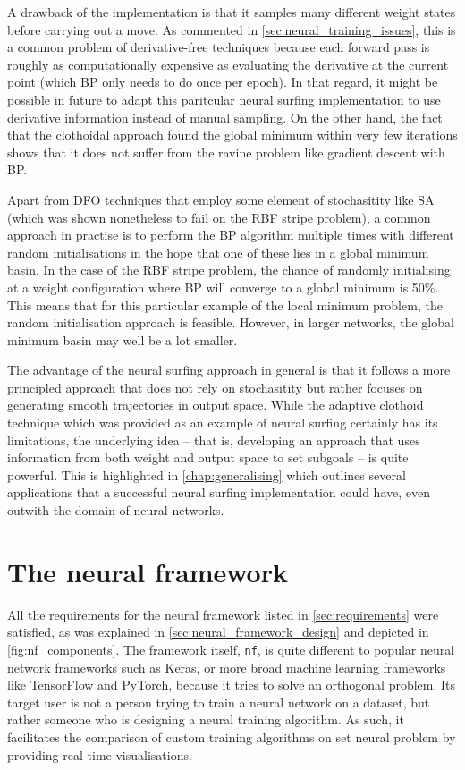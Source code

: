 A drawback of the implementation is that it samples many different weight states before carrying out a move.
As commented in \ref{sec:neural_training_issues}, this is a common problem of derivative-free techniques because each forward pass is roughly as computationally expensive as evaluating the derivative at the current point (which BP only needs to do once per epoch).
In that regard, it might be possible in future to adapt this paritcular neural surfing implementation to use derivative information instead of manual sampling.
On the other hand, the fact that the clothoidal approach found the global minimum within very few iterations shows that it does not suffer from the ravine problem like gradient descent with BP.

Apart from DFO techniques that employ some element of stochasitity like SA (which was shown nonetheless to fail on the RBF stripe problem),
a common approach in practise is to perform the BP algorithm multiple times with different random initialisations in the hope that one of these lies in a global minimum basin.
In the case of the RBF stripe problem, the chance of randomly initialising at a weight configuration where BP will converge to a global minimum is 50\%.
This means that for this particular example of the local minimum problem, the random initialisation approach is feasible.
However, in larger networks, the global minimum basin may well be a lot smaller.

The advantage of the neural surfing approach in general is that it follows a more principled approach that does not rely on stochasitity but rather focuses on generating smooth trajectories in output space.
While the adaptive clothoid technique which was provided as an example of neural surfing certainly has its limitations, the underlying idea -- that is, developing an approach that uses information from both weight and output space to set subgoals -- is quite powerful.
This is highlighted in \ref{chap:generalising} which outlines several applications that a successful neural surfing implementation could have, even outwith the domain of neural networks.

\section{The neural framework}
\label{sec:eval_neural_framework}
All the requirements for the neural framework listed in \ref{sec:requirements} were satisfied, as was explained in \ref{sec:neural_framework_design} and depicted in \ref{fig:nf_components}.
The framework itself, \texttt{nf}, is quite different to popular neural network frameworks such as Keras, or more broad machine learning frameworks like TensorFlow and PyTorch, because it tries to solve an orthogonal problem.
Its target user is not a person trying to train a neural network on a dataset, but rather someone who is designing a neural training algorithm.
As such, it facilitates the comparison of custom training algorithms on set neural problem by providing real-time visualisations.

